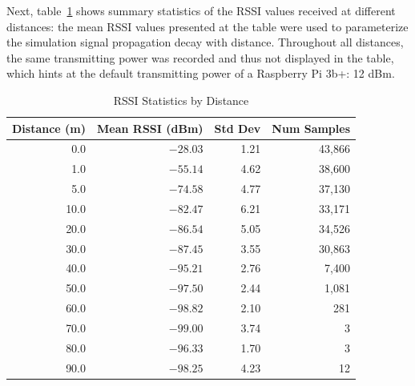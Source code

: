 Next, table~\ref{tab:rssi-stats} shows summary statistics of the RSSI values received at different distances: the mean RSSI values presented at the table were used to parameterize the simulation signal propagation decay with distance.
Throughout all distances, the same transmitting power was recorded and thus not displayed in the table, which hints at the default transmitting power of a Raspberry Pi 3b+: 12 dBm.
\begin{table}[htbp]
    \centering
    \caption{RSSI Statistics by Distance}
    \label{tab:rssi-stats}
    \begin{tabular}{rrrr}
        \toprule
        Distance (m) & Mean RSSI (dBm) & Std Dev & Num Samples \\
        \midrule
        0.0  & $-28.03$ & 1.21 &  43,866 \\
        1.0  & $-55.14$ & 4.62 &  38,600 \\
        5.0  & $-74.58$ & 4.77 &  37,130 \\
        10.0 & $-82.47$ & 6.21 &  33,171 \\
        20.0 & $-86.54$ & 5.05 &  34,526 \\
        30.0 & $-87.45$ & 3.55 &  30,863 \\
        40.0 & $-95.21$ & 2.76 &   7,400 \\
        50.0 & $-97.50$ & 2.44 &   1,081 \\
        60.0 & $-98.82$ & 2.10 &     281 \\
        70.0 & $-99.00$ & 3.74 &       3 \\
        80.0 & $-96.33$ & 1.70 &       3 \\
        90.0 & $-98.25$ & 4.23 &      12 \\
        \bottomrule
    \end{tabular}
\end{table}